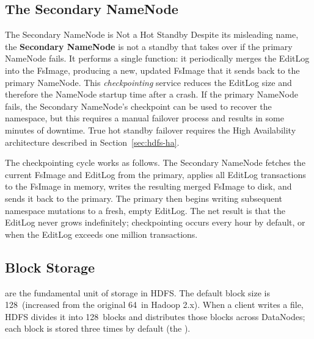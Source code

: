 \subsection{The Secondary NameNode}
\label{subsec:secondary-nn}

\begin{caution}{The Secondary NameNode is Not a Hot Standby}
Despite its misleading name, the \textbf{Secondary NameNode} is not a
standby that takes over if the primary NameNode fails. It performs a
single function: it periodically merges the EditLog into the FsImage,
producing a new, updated FsImage that it sends back to the primary
NameNode. This \emph{checkpointing} service reduces the EditLog size
and therefore the NameNode startup time after a crash. If the primary
NameNode fails, the Secondary NameNode's checkpoint can be used to
recover the namespace, but this requires a manual failover process
and results in some minutes of downtime. True hot standby failover
requires the High Availability architecture described in
Section~\ref{sec:hdfs-ha}.
\end{caution}

The checkpointing cycle works as follows. The Secondary NameNode
fetches the current FsImage and EditLog from the primary, applies all
EditLog transactions to the FsImage in memory, writes the resulting
merged FsImage to disk, and sends it back to the primary. The primary
then begins writing subsequent namespace mutations to a fresh, empty
EditLog. The net result is that the EditLog never grows indefinitely;
checkpointing occurs every hour by default, or when the EditLog exceeds
one million transactions.

\subsection{Block Storage}
\label{subsec:blocks}

 are the fundamental unit of storage in HDFS. The default
block size is 128\MB\ (increased from the original 64\MB\ in Hadoop
2.x). When a client writes a file, HDFS divides it into 128\MB\ blocks
and distributes those blocks across DataNodes; each block is stored
three times by default (the ).

